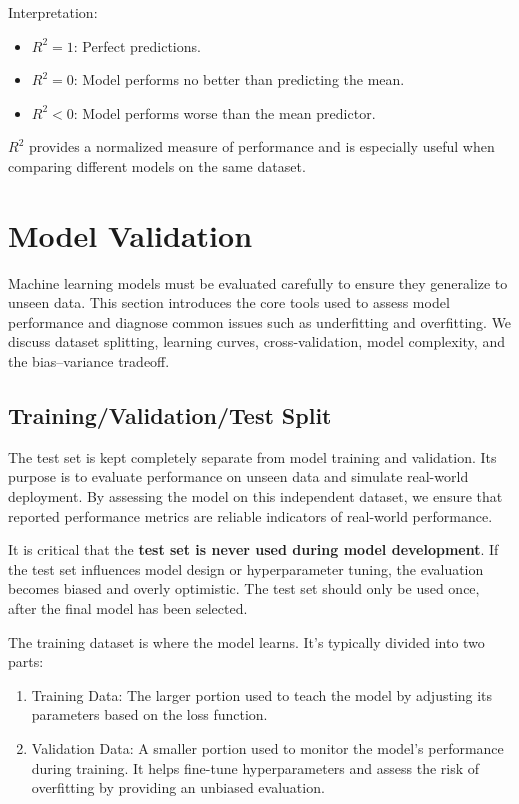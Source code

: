 \documentclass{article}
\begin{document}
Interpretation:

\begin{itemize}
\item \textbf{$R^2 = 1$}: Perfect predictions.
\item \textbf{$R^2 = 0$}: Model performs no better than predicting the mean.
\item \textbf{$R^2 < 0$}: Model performs worse than the mean predictor.
\end{itemize}

$R^2$ provides a normalized measure of performance and is especially useful when comparing different models on the same dataset.




\section{Model Validation}

Machine learning models must be evaluated carefully to ensure they generalize to unseen data. 
This section introduces the core tools used to assess model performance and diagnose common 
issues such as underfitting and overfitting. We discuss dataset splitting, learning curves, 
cross-validation, model complexity, and the bias–variance tradeoff.

\subsection{Training/Validation/Test Split}

The test set is kept completely separate from model training and validation. Its purpose is to evaluate performance on unseen data and simulate real-world deployment. By assessing the model on this independent dataset, we ensure that reported performance metrics are reliable indicators of real-world performance.


It is critical that the \textbf{test set is never used during model development}. 
If the test set influences model design or hyperparameter tuning, the evaluation 
becomes biased and overly optimistic. The test set should only be used once, 
after the final model has been selected.

The training dataset is where the model learns. It’s typically divided into two parts:

\begin{enumerate}
    \item Training Data: The larger portion used to teach the model by adjusting its parameters based on the loss function.
    \item Validation Data: A smaller portion used to monitor the model's performance during training. It helps fine-tune hyperparameters and assess the risk of overfitting by providing an unbiased evaluation.
\end{enumerate}
\end{document}
